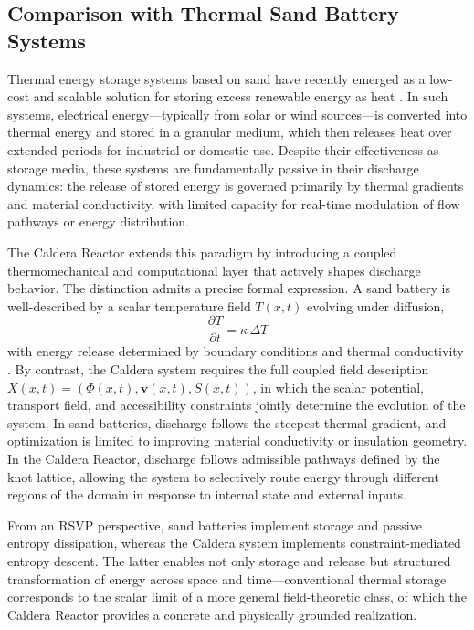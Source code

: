 \documentclass[12pt, a4paper]{article}
\begin{document}
\subsection{Comparison with Thermal Sand Battery Systems}

Thermal energy storage systems based on sand have recently emerged as a low-cost and scalable solution for storing excess renewable energy as heat \cite{sand_battery, tes_review, hybrid_storage}. In such systems, electrical energy---typically from solar or wind sources---is converted into thermal energy and stored in a granular medium, which then releases heat over extended periods for industrial or domestic use. Despite their effectiveness as storage media, these systems are fundamentally passive in their discharge dynamics: the release of stored energy is governed primarily by thermal gradients and material conductivity, with limited capacity for real-time modulation of flow pathways or energy distribution.

The Caldera Reactor extends this paradigm by introducing a coupled thermomechanical and computational layer that actively shapes discharge behavior. The distinction admits a precise formal expression. A sand battery is well-described by a scalar temperature field $T(x,t)$ evolving under diffusion,
\[
\frac{\partial T}{\partial t} = \kappa\, \Delta T
\]
with energy release determined by boundary conditions and thermal conductivity \cite{tes_conductivity}. By contrast, the Caldera system requires the full coupled field description $X(x,t) = (\Phi(x,t), \mathbf{v}(x,t), S(x,t))$, in which the scalar potential, transport field, and accessibility constraints jointly determine the evolution of the system. In sand batteries, discharge follows the steepest thermal gradient, and optimization is limited to improving material conductivity or insulation geometry. In the Caldera Reactor, discharge follows admissible pathways defined by the knot lattice, allowing the system to selectively route energy through different regions of the domain in response to internal state and external inputs.

From an RSVP perspective, sand batteries implement storage and passive entropy dissipation, whereas the Caldera system implements constraint-mediated entropy descent. The latter enables not only storage and release but structured transformation of energy across space and time---conventional thermal storage corresponds to the scalar limit of a more general field-theoretic class, of which the Caldera Reactor provides a concrete and physically grounded realization.
\end{document}
